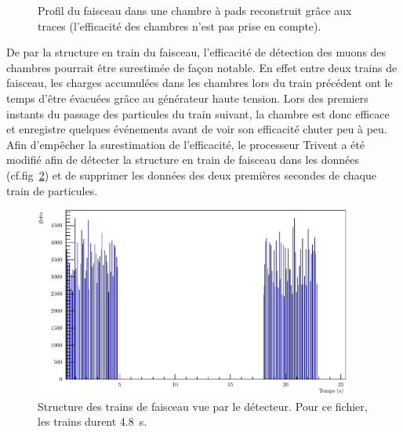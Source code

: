 \begin{figure}[ht!]
	\centering
	\hfill
	\caption{Profil du faisceau dans une chambre à pads reconstruit grâce aux traces (l’efficacité des chambres n’est pas prise en compte).}
	\label{ProfilFaisceauSPS}
\end{figure}

De par la structure en train du faisceau, l'efficacité de détection des muons des chambres pourrait être surestimée de façon notable. En effet entre deux trains de faisceau, les charges accumulées dans les chambres lors du train précédent ont le temps d'être évacuées grâce au générateur haute tension. Lors des premiers instants du passage des particules du train suivant, la chambre est donc efficace et enregistre quelques événements avant de voir son efficacité chuter peu à peu. Afin d'empêcher la surestimation de l'efficacité, le processeur Trivent a été modifié afin de détecter la structure en train de faisceau dans les données (cf.fig~\ref{StructureSpill}) et de supprimer les données des deux premières secondes de chaque train de particules.
\vspace*{0.4cm}
\begin{figure}[!ht]
	\centering
	\includegraphics[width=0.93\textwidth]{GLA/SpillStructure.pdf}
	\caption{Structure des trains de faisceau vue par le détecteur. Pour ce fichier, les trains durent \SI{4.8}{\second}.}
	\label{StructureSpill}
\end{figure}

